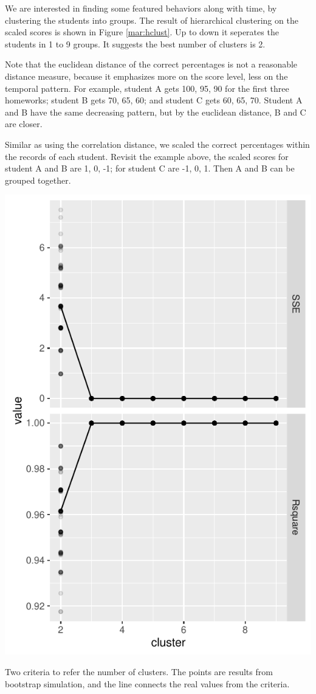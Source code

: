 \documentclass[12pt,nohyper]{tufte-handout}\usepackage[]{graphicx}\usepackage[]{color}
\begin{document}
We are interested in finding some featured behaviors along with time,
by clustering the students into groups. The result of hierarchical 
clustering on the scaled scores is shown in Figure \ref{mar:hclust}. 
Up to down it seperates the students in 1 to 9 groups.
It suggests the best number of clusters is 2.

Note that the euclidean distance of the correct percentages 
is not a reasonable distance measure, because it emphasizes
more on the score level, less on the temporal pattern. 
For example, student A gets 100, 95, 90 for the first three homeworks;
student B gets 70, 65, 60; and student C gets 60, 65, 70.
Student A and B have the same decreasing pattern, but by the 
euclidean distance, B and C are closer.

Similar as using the correlation distance, we scaled the 
correct percentages within the records of each student.
Revisit the example above, the scaled scores for student 
A and B are 1, 0, -1; for student C are -1, 0, 1. Then 
A and B can be grouped together.

\begin{marginfigure}
\includegraphics[width=0.98\linewidth]{Stat101_allSections_screeplot}
\caption{\label{mar:scree}Two criteria to refer the number of clusters.
The points are results from bootstrap simulation, and the line connects 
the real values from the criteria.}
\end{marginfigure}
\end{document}
